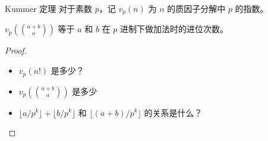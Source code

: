 \begin{frame}{Kummer 定理}
    对于素数 $p$，记 $v_p(n)$ 为 $n$ 的质因子分解中 $p$ 的指数。

    \begin{theorem}[Kummer]
        $v_p(\binom{a+b}{a})$ 等于 $a$ 和 $b$ 在 $p$ 进制下做加法时的进位次数。
    \end{theorem}
    \begin{proof}
        \begin{itemize}
            \item $v_p(n!)$ 是多少？
            \item $v_p(\binom{a+b}{a})$ 是多少
            \item $\lfloor a/p^k\rfloor+\lfloor b/p^k\rfloor$ 和 $\lfloor (a+b)/p^k\rfloor$ 的关系是什么？
        \end{itemize}
    \end{proof}
\end{frame}


